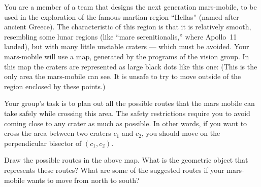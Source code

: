 You are a member of a team that designs the next generation
mars-mobile, to be used in the exploration of the famous martian region
``Hellas'' (named after ancient Greece).  The characteristic of this
region is that it is relatively smooth, resembling some lunar regions
(like ``mare serenitionalis,'' where Apollo~11 landed), but with many
little unstable craters --- which must be avoided.  Your mars-mobile
will use a map, generated by the programs of the vision group. In this
map the craters are represented as large black dots like this one:
(This is the only area the mars-mobile can see.  It is unsafe to try to
move outside of the region enclosed by these points.)

 \vspace{4mm} \par
\begin{figure}[h]
\centerline{}\end{figure}
 \par
\vspace{4mm}


Your group's task is to  plan out all the possible routes that the mars
mobile can take safely while crossing this area.  The safety
restrictions require you to avoid coming close to any crater as much as
possible. In other words, if you want to cross the area between two
craters $c_1$ and $c_2$, you should move on the perpendicular bisector
of $(c_1, c_2)$.

Draw the possible routes in the above map.  What is the geometric
object that represents these routes?  What are some of the suggested
routes if your mars-mobile wants to move from north to south?
